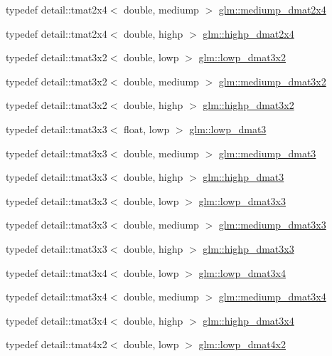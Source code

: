 \begin{CompactItemize}
typedef detail::tmat2x4$<$ double, mediump $>$ \hyperlink{group__core__precision_gdb60bf60ef2b8da4a28a372b2bcca3a3}{glm::mediump\_\-dmat2x4}
\item 
typedef detail::tmat2x4$<$ double, highp $>$ \hyperlink{group__core__precision_gcd51d8188f7d66a83c035b8c4cd69f2d}{glm::highp\_\-dmat2x4}
\item 
typedef detail::tmat3x2$<$ double, lowp $>$ \hyperlink{group__core__precision_g678c21e4fadeda255cfb146d40844bdd}{glm::lowp\_\-dmat3x2}
\item 
typedef detail::tmat3x2$<$ double, mediump $>$ \hyperlink{group__core__precision_gff0060984716bcda68ff69ed27536bf6}{glm::mediump\_\-dmat3x2}
\item 
typedef detail::tmat3x2$<$ double, highp $>$ \hyperlink{group__core__precision_gc956fe6b946f0ccee78367ccd5427351}{glm::highp\_\-dmat3x2}
\item 
typedef detail::tmat3x3$<$ float, lowp $>$ \hyperlink{group__core__precision_g07d9423bdde2d7ff880d6ece01dc9e32}{glm::lowp\_\-dmat3}
\item 
typedef detail::tmat3x3$<$ double, mediump $>$ \hyperlink{group__core__precision_g80600af2c1ca11ead6123777185c372d}{glm::mediump\_\-dmat3}
\item 
typedef detail::tmat3x3$<$ double, highp $>$ \hyperlink{group__core__precision_g993461e1d2caf19abd4f64d02ccdafa9}{glm::highp\_\-dmat3}
\item 
typedef detail::tmat3x3$<$ double, lowp $>$ \hyperlink{group__core__precision_gea1bc4ede38e1b904f01ff5ce59210ea}{glm::lowp\_\-dmat3x3}
\item 
typedef detail::tmat3x3$<$ double, mediump $>$ \hyperlink{group__core__precision_g2f73508d8192390ca9f9b569f544fade}{glm::mediump\_\-dmat3x3}
\item 
typedef detail::tmat3x3$<$ double, highp $>$ \hyperlink{group__core__precision_gd7229dea82287910d88e6e8566e39fc7}{glm::highp\_\-dmat3x3}
\item 
typedef detail::tmat3x4$<$ double, lowp $>$ \hyperlink{group__core__precision_g4640e1d20ad705842525e79a4cc57b15}{glm::lowp\_\-dmat3x4}
\item 
typedef detail::tmat3x4$<$ double, mediump $>$ \hyperlink{group__core__precision_gedd814e706701200b13b86fc6fd7b373}{glm::mediump\_\-dmat3x4}
\item 
typedef detail::tmat3x4$<$ double, highp $>$ \hyperlink{group__core__precision_gff199c8d04a8edb92ed43283e8694c59}{glm::highp\_\-dmat3x4}
\item 
typedef detail::tmat4x2$<$ double, lowp $>$ \hyperlink{group__core__precision_g28a7ef670069c3707f19b9de1039517e}{glm::lowp\_\-dmat4x2}

\end{CompactItemize}
